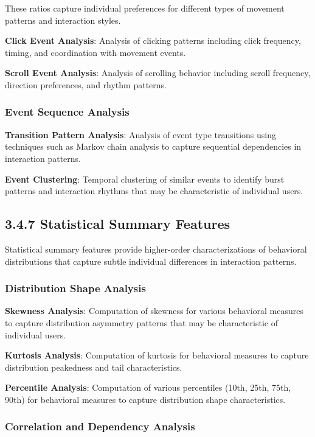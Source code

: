 \documentclass[
  12pt,
  a4paper,
]{report}
\begin{document}
These ratios capture individual preferences for different types of
movement patterns and interaction styles.

\textbf{Click Event Analysis}: Analysis of clicking patterns including
click frequency, timing, and coordination with movement events.

\textbf{Scroll Event Analysis}: Analysis of scrolling behavior including
scroll frequency, direction preferences, and rhythm patterns.

\subsubsection{Event Sequence Analysis}\label{event-sequence-analysis}

\textbf{Transition Pattern Analysis}: Analysis of event type transitions
using techniques such as Markov chain analysis to capture sequential
dependencies in interaction patterns.

\textbf{Event Clustering}: Temporal clustering of similar events to
identify burst patterns and interaction rhythms that may be
characteristic of individual users.

\subsection{3.4.7 Statistical Summary
Features}\label{statistical-summary-features}

Statistical summary features provide higher-order characterizations of
behavioral distributions that capture subtle individual differences in
interaction patterns.

\subsubsection{Distribution Shape
Analysis}\label{distribution-shape-analysis}

\textbf{Skewness Analysis}: Computation of skewness for various
behavioral measures to capture distribution asymmetry patterns that may
be characteristic of individual users.

\textbf{Kurtosis Analysis}: Computation of kurtosis for behavioral
measures to capture distribution peakedness and tail characteristics.

\textbf{Percentile Analysis}: Computation of various percentiles (10th,
25th, 75th, 90th) for behavioral measures to capture distribution shape
characteristics.

\subsubsection{Correlation and Dependency
Analysis}\label{correlation-and-dependency-analysis}
\end{document}
